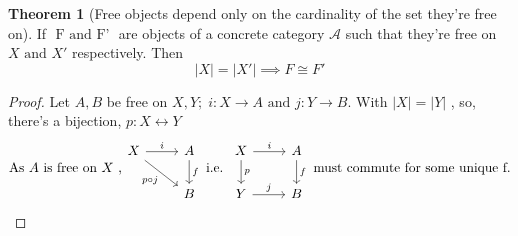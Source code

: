 \documentclass{article}
\theoremstyle{definition}
\theoremstyle{definition}
\newtheorem{theorem}{Theorem}[section]
\begin{document}
\begin{theorem}[Free objects depend only on the cardinality of the set they're free on] %
	If $ \text{ F and F' }$ are objects of a concrete category $ \mathcal{A} $ such that they're free on $ X \text{ and } X' $ respectively. Then
	\[ |X|=|X'| \implies F \cong F'\]
\end{theorem}
\begin{proof}
	Let $ A,B $ be free on $ X,Y ;\; i:X \rightarrow A \text{ and } j:Y \rightarrow B $. With $ |X|=|Y| $ , so, there's a bijection, $ p: X \leftrightarrow Y $
	\begin{equation}
		\text{As $ A$  is free on $ X $ ,}
		\begin{tikzcd}
			X \arrow{r}{i} \arrow[swap]{dr}{p \circ j} & A  \arrow{d}{f} \\ & B
		\end{tikzcd}
		\text{ i.e. }
		\begin{tikzcd}
			X \arrow{r}{i} \arrow{d}{p} & A  \arrow{d}{f} \\ Y \arrow{r}{j} & B
		\end{tikzcd}
		\text{ must commute for some unique f.}
	\end{equation}


\end{proof}
\end{document}
